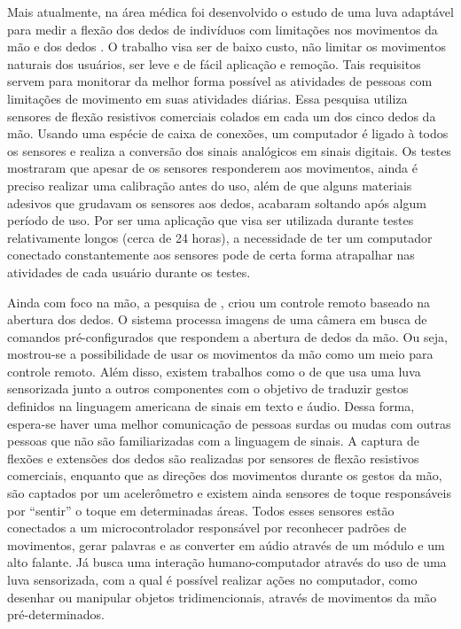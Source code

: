 \documentclass[
	12pt,				%
	openright,			%
	oneside,			%
	a4paper,			%
	english,			%
	brazil				%
	]{abntex2}
\begin{document}
		Mais atualmente, na área médica foi desenvolvido o estudo de uma luva adaptável para medir a flexão dos dedos de indivíduos com limitações nos movimentos da mão e dos dedos \cite{simone2004lowcost}. O trabalho visa ser de baixo custo, não limitar os movimentos naturais dos usuários, ser leve e de fácil aplicação e remoção. Tais requisitos servem para monitorar da melhor forma possível as atividades de pessoas com limitações de movimento em suas atividades diárias. Essa pesquisa utiliza sensores de flexão resistivos comerciais colados em cada um dos cinco dedos da mão. Usando uma espécie de caixa de conexões, um computador é ligado à todos os sensores e realiza a conversão dos sinais analógicos em sinais digitais. Os testes mostraram que apesar de os sensores responderem aos movimentos, ainda é preciso realizar uma calibração antes do uso, além de que alguns materiais adesivos que grudavam os sensores aos dedos, acabaram soltando após algum período de uso. Por ser uma aplicação que visa ser utilizada durante testes relativamente longos (cerca de 24 horas), a necessidade de ter um computador conectado constantemente aos sensores pode de certa forma atrapalhar nas atividades de cada usuário durante os testes.		
		
		Ainda com foco na mão, a pesquisa de \cite{daeholee2009vision}, criou um controle remoto baseado na abertura dos dedos. O sistema processa imagens de uma câmera em busca de comandos pré-configurados que respondem a abertura de dedos da mão. Ou seja, mostrou-se a possibilidade de usar os movimentos da mão como um meio para controle remoto. Além disso, existem trabalhos como o de \cite{anbarasi2013deafmute} que usa uma luva sensorizada junto a outros componentes com o objetivo de traduzir gestos definidos na linguagem americana de sinais em texto e áudio. Dessa forma, espera-se haver uma melhor comunicação de pessoas surdas ou mudas com outras pessoas que não são familiarizadas com a linguagem de sinais. A captura de flexões e extensões dos dedos são realizadas por sensores de flexão resistivos comerciais, enquanto que as direções dos movimentos durante os gestos da mão, são captados por um acelerômetro e existem ainda sensores de toque responsáveis por ``sentir'' o toque em determinadas áreas. Todos esses sensores estão conectados a um microcontrolador responsável por reconhecer padrões de movimentos, gerar palavras e as converter em aúdio através de um módulo e um alto falante. Já \cite{kumar2012hci} busca uma interação humano-computador através do uso de uma luva sensorizada, com a qual é possível realizar ações no computador, como desenhar ou manipular objetos tridimencionais, através de movimentos da mão pré-determinados.
		
\end{document}
